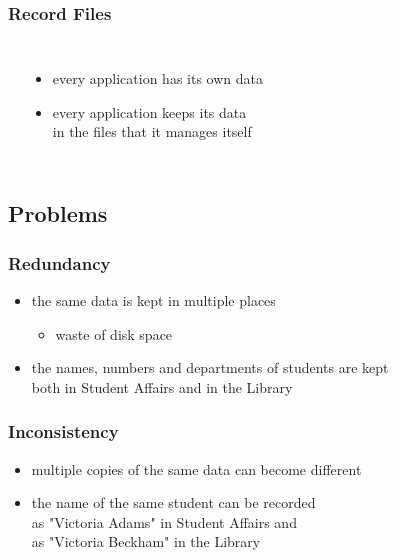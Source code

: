 \documentclass[dvipsnames]{beamer}
\theoremstyle{plain}
\begin{document}
\begin{frame}
  \frametitle{Record Files}

  \begin{columns}[b]
    \begin{center}
    \end{center}

    \begin{itemize}
      \item every application has its own data
      \item every application keeps its data\\
        in the files that it manages itself
    \end{itemize}
  \end{columns}
\end{frame}

\subsection{Problems}

\begin{frame}
  \frametitle{Redundancy}

  \begin{itemize}
    \item the same data is kept in multiple places
    \begin{itemize}
      \item waste of disk space
    \end{itemize}
  \end{itemize}

  \pause
  \begin{example}
    \begin{itemize}
      \item the names, numbers and departments of students are kept\\
        both in Student Affairs and in the Library
    \end{itemize}
  \end{example}
\end{frame}

\begin{frame}
  \frametitle{Inconsistency}

  \begin{itemize}
    \item multiple copies of the same data can become different
  \end{itemize}

  \pause
  \begin{example}
    \begin{itemize}
      \item the name of the same student can be recorded\\
        as "Victoria Adams" in Student Affairs and\\
        as "Victoria Beckham" in the Library
    \end{itemize}
  \end{example}
\end{frame}
\end{document}
